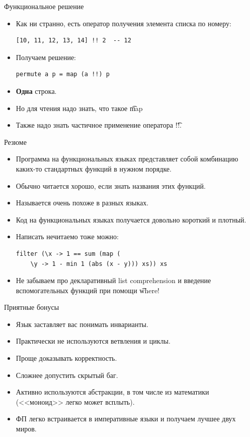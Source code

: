 \begin{frame}[fragile]{Функциональное решение}
	\begin{itemize}
		\item Как ни странно, есть оператор получения элемента списка по номеру:
\begin{verbatim}
[10, 11, 12, 13, 14] !! 2  -- 12
\end{verbatim}
		\item Получаем решение:
\begin{verbatim}
permute a p = map (a !!) p
\end{verbatim}
		\item \textbf{Одна} строка.
		\item Но для чтения надо знать, что такое \t{map}
		\item Также надо знать частичное применение оператора \t{!!}.
	\end{itemize}
\end{frame}

\begin{frame}[fragile]{Резюме}
	\begin{itemize}
		\item Программа на функциональных языках представляет собой комбинацию каких-то стандартных функций в нужном порядке.
		\item Обычно читается хорошо, если знать названия этих функций.
		\item Называется очень похоже в разных языках.
		\item Код на функциональных языках получается довольно короткий и плотный.
		\item Написать нечитаемо тоже можно:
\begin{verbatim}
filter (\x -> 1 == sum (map (
    \y -> 1 - min 1 (abs (x - y))) xs)) xs
\end{verbatim}
		\item Не забываем про декларативный list comprehension и введение вспомогательных функций при помощи \t{where}!
	\end{itemize}
\end{frame}

\begin{frame}{Приятные бонусы}
	\begin{itemize}
		\item Язык заставляет вас понимать инварианты.
		\item Практически не используются ветвления и циклы.
		\item Проще доказывать корректность.
		\item Сложнее допустить скрытый баг.
		\item Активно используются абстракции, в том числе из математики (<<моноид>> легко может всплыть).
		\item ФП легко встраивается в императивные языки и получаем лучшее двух миров.
	\end{itemize}
\end{frame}

